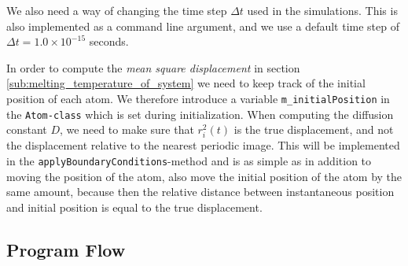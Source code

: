\documentclass[a4paper]{article}
\begin{document}
    We also need a way of changing the time step $\Delta t$ used in the
    simulations. This is also implemented as a command line argument, and we
    use a default time step of $\Delta t = 1.0 \times 10^{-15}$ seconds.
    
    In order to compute the \emph{mean square displacement} in section
    \ref{sub:melting_temperature_of_system} we need to keep track of the
    initial position of each atom. We therefore introduce a variable
    \texttt{m\_initialPosition} in the \texttt{Atom-class} which is set during
    initialization.  When computing the diffusion constant $D$, we need to make
    sure that $r_i^2(t)$ is the true displacement, and not the displacement
    relative to the nearest periodic image. This will be implemented in the
    \texttt{applyBoundaryConditions}-method and is as simple as in addition to
    moving the position of the atom, also move the initial position of the atom
    by the same amount, because then the relative distance between instantaneous
    position and initial position is equal to the true displacement.

    \subsection{Program Flow}
    \label{sub:program_flow}
\end{document}

